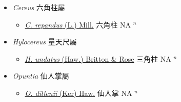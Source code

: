 
  \begin{itemize}
 \item[] \textit{Cereus} 六角柱屬
                    
  \begin{itemize}
        \item[] \href{http://www.theplantlist.org/tpl1.1/search?q=Cereus+repandus}{\textit{C. repandus} (L.) Mill.}   六角柱 NA $^n$
  \end{itemize}
 \item[] \textit{Hylocereus} 量天尺屬
                    
  \begin{itemize}
        \item[] \href{http://www.theplantlist.org/tpl1.1/search?q=Hylocereus+undatus}{\textit{H. undatus} (Haw.) Britton \& Rose}   三角柱 NA $^n$
  \end{itemize}
 \item[] \textit{Opuntia} 仙人掌屬
                    
  \begin{itemize}
        \item[] \href{http://www.theplantlist.org/tpl1.1/search?q=Opuntia+dillenii}{\textit{O. dillenii} (Ker) Haw.}   仙人掌 NA $^n$
  \end{itemize}
  \end{itemize}
